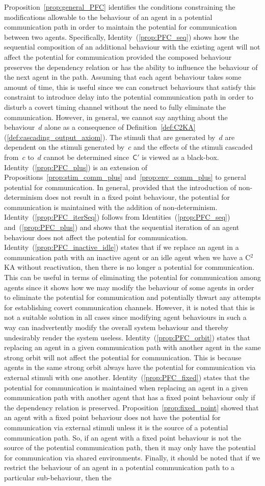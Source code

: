\documentclass[copyright,creativecommons]{eptcs}
\makeatletter
\newcommand{\PFC}{potential for communication\@\xspace}
\newcommand{\CCKAabbrv}{C$^2$KA\@\xspace}
\newcommand{\Agent}[1]{\mathsf{#1}}
\makeatother
\begin{document}
Proposition~\ref{prop:general_PFC} identifies the conditions constraining the modifications allowable to the behaviour of an agent in a potential communication path in order to maintain the \PFC between two agents. Specifically, Identity~(\ref{prop:PFC_seq}) shows how the sequential composition of an additional behaviour with the existing agent will not affect the \PFC provided the composed behaviour preserves the dependency relation or has the ability to influence the behaviour of the next agent in the path. Assuming that each agent behaviour takes some amount of time, this is useful since we can construct behaviours that satisfy this constraint to introduce delay into the potential communication path in order to disturb a covert timing channel without the need to fully eliminate the communication. However, in general, we cannot say anything about the behaviour~$d$ alone as a consequence of Definition~\ref{def:C2KA}(\ref{def:cascading_output_axiom}). The stimuli that are generated by~$d$ are dependent on the stimuli generated by~$c$ and the effects of the stimuli cascaded from~$c$ to~$d$ cannot be determined since~$\Agent{C'}$ is viewed as a black-box. Identity~(\ref{prop:PFC_plus}) is an extension of Propositions~\ref{prop:stim_comm_plus} and~\ref{prop:env_comm_plus} to general \PFC. In general, provided that the introduction of non-determinism does not result in a fixed point behaviour, the \PFC is maintained with the addition of non-determinism. Identity~(\ref{prop:PFC_iterSeq}) follows from Identities~(\ref{prop:PFC_seq}) and~(\ref{prop:PFC_plus}) and shows that the sequential iteration of an agent behaviour does not affect the \PFC. Identity~(\ref{prop:PFC_inactive_idle}) states that if we replace an agent in a communication path with an inactive agent or an idle agent when we have a \CCKAabbrv without reactivation, then there is no longer a \PFC. This can be useful in terms of eliminating the \PFC among agents since it shows how we may modify the behaviour of some agents in order to eliminate the \PFC and potentially thwart any attempts for establishing covert communication channels. However, it is noted that this is not a suitable solution in all cases since modifying agent behaviours in such a way can inadvertently modify the overall system behaviour and thereby undesirably render the system useless. Identity~(\ref{prop:PFC_orbit}) states that replacing an agent in a given communication path with another agent in the same strong orbit will not affect the \PFC. This is because agents in the same strong orbit always have the \PFC via external stimuli with one another. Identity~(\ref{prop:PFC_fixed}) states that the \PFC is maintained when replacing an agent in a given communication path with another agent that has a fixed point behaviour only if the dependency relation is preserved. Proposition~\ref{prop:fixed_point} showed that an agent with a fixed point behaviour does not have the \PFC via external stimuli unless it is the source of a potential communication path. So, if an agent with a fixed point behaviour is not the source of the potential communication path, then it may only have the \PFC via shared environments. Finally, it should be noted that if we restrict the behaviour of an agent in a potential communication path to a particular sub-behaviour, then the 
\end{document}
